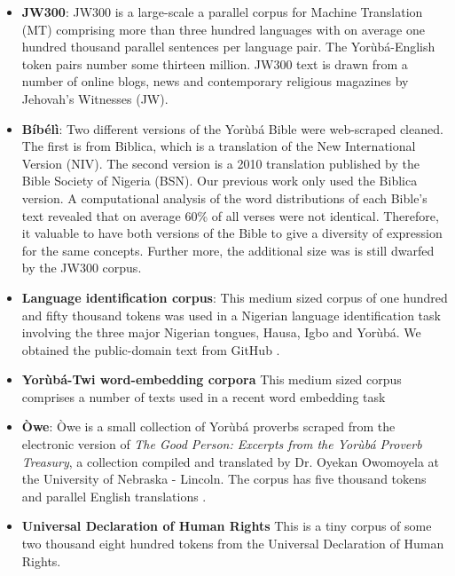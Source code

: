 \documentclass{article} %
\begin{document}
\begin{itemize}

\item \textbf{JW300}: JW300 is a large-scale a parallel corpus for Machine Translation (MT) comprising more than three hundred languages with on average one hundred thousand parallel sentences per language pair. The Yor{\`u}b{\'a}-English token pairs number some thirteen million. JW300 text is drawn from a number of online blogs, news and contemporary religious magazines by Jehovah's Witnesses (JW).

\item \textbf{B{\'i}b{\'e}l{\`i}}: Two different versions of the Yor{\`u}b{\'a} Bible were web-scraped cleaned. The first is from Biblica, which is a translation of the New International Version (NIV). The second version is a 2010 translation published by the Bible Society of Nigeria (BSN). Our previous work only used the Biblica version. A computational analysis of the word distributions of each Bible's text revealed that on average 60\% of all verses were not identical. Therefore, it valuable to have both versions of the Bible to give a diversity of expression for the same concepts. Further more, the additional size was is still dwarfed by the JW300 corpus. 

\item \textbf{Language identification corpus}: This medium sized corpus of one hundred and fifty thousand tokens was used in a Nigerian language identification task involving the three major Nigerian tongues, Hausa, Igbo and Yor{\`u}b{\'a}. We obtained the public-domain text from GitHub \cite{Asubiaro_langid}.

\item \textbf{Yor{\`u}b{\'a}-Twi word-embedding corpora}
This medium sized corpus comprises a number of texts used in a recent word embedding task 

\item \textbf{{\`O}we}: {\`O}we is a small collection of Yor{\`u}b{\'a} proverbs scraped from the electronic version of \emph{The Good Person: Excerpts from the Yor{\`u}b{\'a} Proverb Treasury}, a collection compiled and translated by Dr. Oyekan Owomoyela at the University of Nebraska - Lincoln. The corpus has five thousand tokens and parallel English translations \cite{oweyoruba}.

\item \textbf{Universal Declaration of Human Rights}
This is a tiny corpus of some two thousand eight hundred tokens from the Universal Declaration of Human Rights.


\end{itemize}
\end{document}
